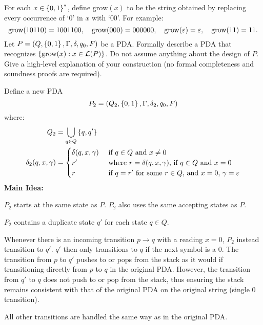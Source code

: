 \begin{problem}
  For each $x \in \left\{0, 1\right\}^*$, define $\text{grow}(x)$ to be the string
  obtained by replacing every occurrence of `$0$' in $x$ with `$00$'.
  For example:
  \[ 
          \text{grow}(10110) = 1001100,
    \quad \text{grow}(000) = 000000,
    \quad \text{grow}(\varepsilon) = \varepsilon,
    \quad \text{grow}(11) = 11.
  \]
  Let $P = (Q, \left\{0, 1\right\}, \Gamma, \delta, q_0, F)$ be a PDA.
  Formally describe a PDA that recognizes $\left\{\text{grow}(x) : x \in \mathcal{L}(P)\right\}$.
  Do not assume anything about the design of $P$. \\
  Give a high-level explanation of your construction
  (no formal completeness and soundness proofs are required).
\end{problem}
\begin{Answer}
  Define a new PDA
  \[ P_2 = (Q_2, \left\{0, 1\right\}, \Gamma, \delta_2, q_0, F) \]
  where:
  \begin{align*}
    Q_2 &= \bigcup_{q \in Q} \left\{q, q'\right\} \\
    \delta_2(q, x, \gamma) &= \begin{cases}
      \delta(q, x, \gamma) &\text{ if $q \in Q$ and $x \ne 0$} \\
      r' &\text{ where $r = \delta(q, x, \gamma)$, if $q \in Q$ and $x = 0$} \\
      r &\text{ if $q = r'$ for some $r \in Q$, and $x = 0$, $\gamma = \varepsilon$}
    \end{cases}
  \end{align*}
  \textbf{Main Idea:}
  \begin{enumroman}
    \item $P_2$ starts at the same state as $P$.
      $P_2$ also uses the same accepting states as $P$.
    \item $P_2$ contains a duplicate state $q'$ for each state $q \in Q$.
    \item Whenever there is an incoming transition $p \to q$ with a reading $x = 0$,
      $P_2$ instead transition to $q'$. $q'$ then only transitions to $q$ if the next
      symbol is a $0$.
      The transition from $p$ to $q'$ pushes to or pops from the stack as
      it would if transitioning directly from $p$ to $q$ in the original PDA.
      However, the transition from $q'$ to $q$ does not push to or pop from the stack,
      thus ensuring the stack remains consistent with that of the original
      PDA on the original string (single $0$ transition).
    \item All other transitions are handled the same way as in the original PDA.
  \end{enumroman}

\end{Answer}
